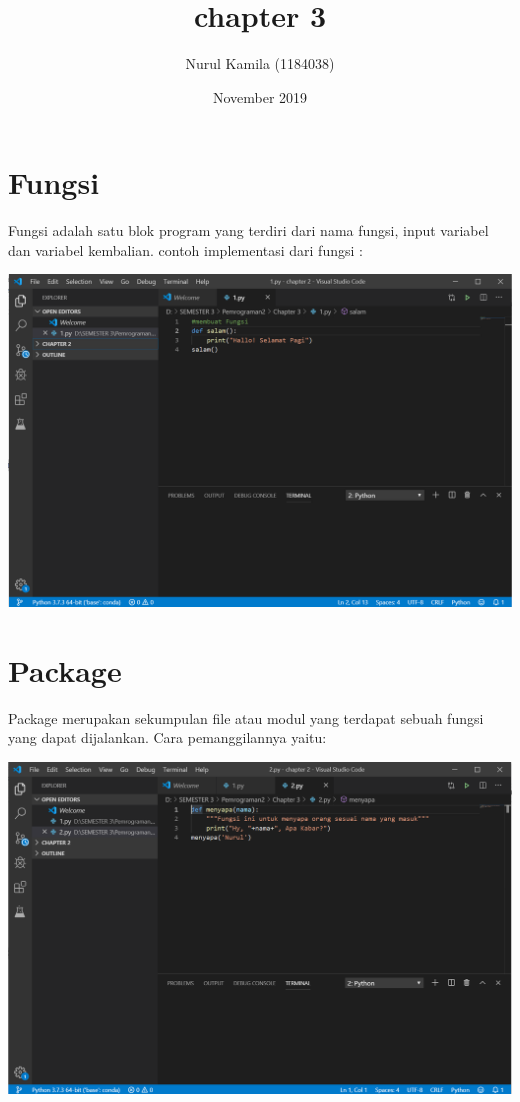 \documentclass{article}
\title{chapter 3}
\author{Nurul Kamila (1184038) }
\date{November 2019}
\begin{document}
\maketitle
\section{Fungsi}
Fungsi adalah satu blok program yang terdiri dari nama fungsi, input variabel dan variabel kembalian.
contoh implementasi dari fungsi :
\begin{center}
    \includegraphics[width=.8\textwidth]{keterampilan/1.PNG}
\end{center}

\section{Package}
Package merupakan sekumpulan file atau modul yang terdapat sebuah fungsi yang dapat dijalankan. Cara pemanggilannya yaitu:
\begin{center}
    \includegraphics[width=.8\textwidth]{keterampilan/2.PNG}
\end{center}
\end{document}
